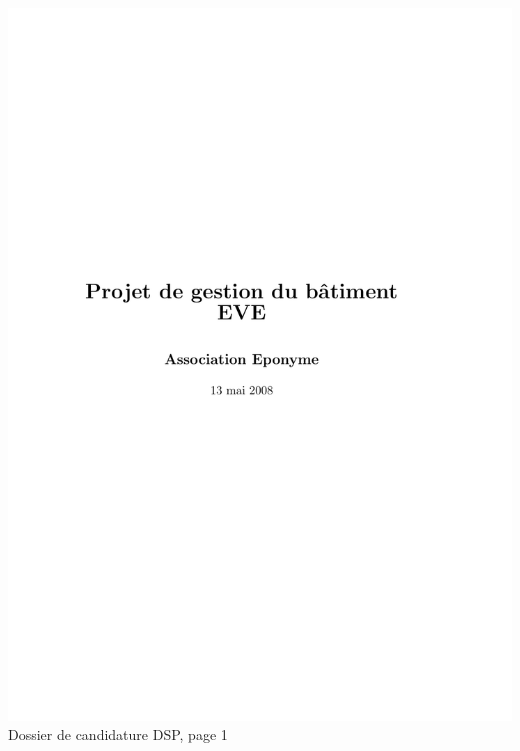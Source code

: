 \includegraphics[scale=0.85,trim=20mm 20mm 20mm 20mm,clip,page=1]{annexes/candidature_dsp.pdf} \\
Dossier de candidature DSP, page 1
\newpage
